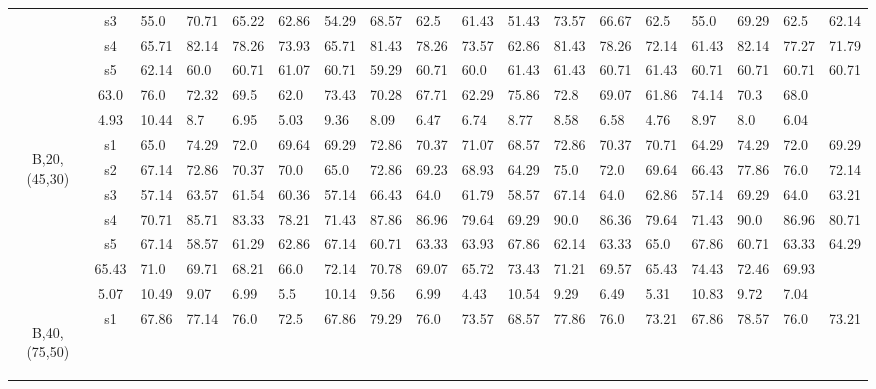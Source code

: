 \begin{table}[h]
{\begin{tabular}{cc|llll|llll|llll|llll}
 & s3 & 55.0 & 70.71 & 65.22 & 62.86 & 54.29 & 68.57 & 62.5 & 61.43 & 51.43 & 73.57 & 66.67 & 62.5 & 55.0 & 69.29 & 62.5 & 62.14 \\
 & s4 & 65.71 & 82.14 & 78.26 & 73.93 & 65.71 & 81.43 & 78.26 & 73.57 & 62.86 & 81.43 & 78.26 & 72.14 & 61.43 & 82.14 & 77.27 & 71.79 \\
 & s5 & 62.14 & 60.0 & 60.71 & 61.07 & 60.71 & 59.29 & 60.71 & 60.0 & 61.43 & 61.43 & 60.71 & 61.43 & 60.71 & 60.71 & 60.71 & 60.71 \\
\rowcolor{lightgray!50}\multicolumn{2}{r|}{avg} & 63.0 & 76.0 & 72.32 & 69.5 & 62.0 & 73.43 & 70.28 & 67.71 & 62.29 & 75.86 & 72.8 & 69.07 & 61.86 & 74.14 & 70.3 & 68.0 \\
\rowcolor{lightgray!50}\multicolumn{2}{r|}{std} & 4.93 & 10.44 & 8.7 & 6.95 & 5.03 & 9.36 & 8.09 & 6.47 & 6.74 & 8.77 & 8.58 & 6.58 & 4.76 & 8.97 & 8.0 & 6.04 \\
\multirow{6}{*}{\begin{sideways}B,20,(45,30)\end{sideways}} & s1 & 65.0 & 74.29 & 72.0 & 69.64 & 69.29 & 72.86 & 70.37 & 71.07 & 68.57 & 72.86 & 70.37 & 70.71 & 64.29 & 74.29 & 72.0 & 69.29 \\
 & s2 & 67.14 & 72.86 & 70.37 & 70.0 & 65.0 & 72.86 & 69.23 & 68.93 & 64.29 & 75.0 & 72.0 & 69.64 & 66.43 & 77.86 & 76.0 & 72.14 \\
 & s3 & 57.14 & 63.57 & 61.54 & 60.36 & 57.14 & 66.43 & 64.0 & 61.79 & 58.57 & 67.14 & 64.0 & 62.86 & 57.14 & 69.29 & 64.0 & 63.21 \\
 & s4 & 70.71 & 85.71 & 83.33 & 78.21 & 71.43 & 87.86 & 86.96 & 79.64 & 69.29 & 90.0 & 86.36 & 79.64 & 71.43 & 90.0 & 86.96 & 80.71 \\
 & s5 & 67.14 & 58.57 & 61.29 & 62.86 & 67.14 & 60.71 & 63.33 & 63.93 & 67.86 & 62.14 & 63.33 & 65.0 & 67.86 & 60.71 & 63.33 & 64.29 \\
\rowcolor{lightgray!50}\multicolumn{2}{r|}{avg} & 65.43 & 71.0 & 69.71 & 68.21 & 66.0 & 72.14 & 70.78 & 69.07 & 65.72 & 73.43 & 71.21 & 69.57 & 65.43 & 74.43 & 72.46 & 69.93 \\
\rowcolor{lightgray!50}\multicolumn{2}{r|}{std} & 5.07 & 10.49 & 9.07 & 6.99 & 5.5 & 10.14 & 9.56 & 6.99 & 4.43 & 10.54 & 9.29 & 6.49 & 5.31 & 10.83 & 9.72 & 7.04 \\
\multirow{6}{*}{\begin{sideways}B,40,(75,50)\end{sideways}} & s1 & 67.86 & 77.14 & 76.0 & 72.5 & 67.86 & 79.29 & 76.0 & 73.57 & 68.57 & 77.86 & 76.0 & 73.21 & 67.86 & 78.57 & 76.0 & 73.21 \\

\end{tabular}}
\end{table}
